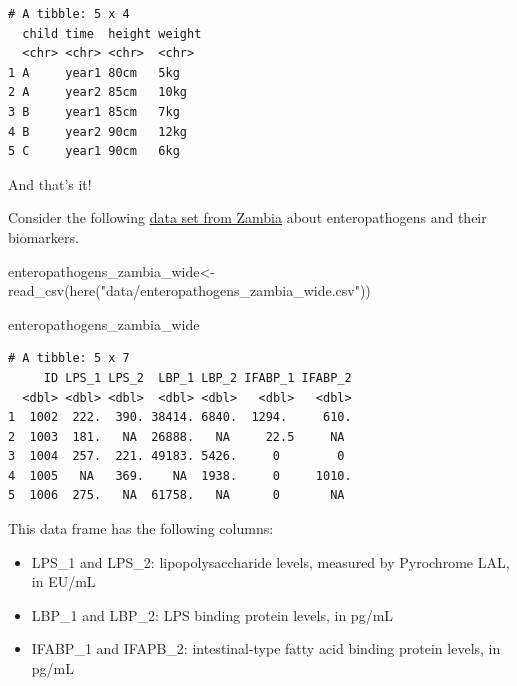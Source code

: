\documentclass[
  letterpaper,
  DIV=11,
  numbers=noendperiod]{scrreprt}
\newenvironment{Shaded}{\begin{snugshade}}{\end{snugshade}}
\newcommand{\FunctionTok}[1]{\textcolor[rgb]{0.28,0.35,0.67}{#1}}
\newcommand{\NormalTok}[1]{\textcolor[rgb]{0.00,0.23,0.31}{#1}}
\newcommand{\OtherTok}[1]{\textcolor[rgb]{0.00,0.23,0.31}{#1}}
\newcommand{\StringTok}[1]{\textcolor[rgb]{0.13,0.47,0.30}{#1}}
\begin{document}
\begin{verbatim}
# A tibble: 5 x 4
  child time  height weight
  <chr> <chr> <chr>  <chr> 
1 A     year1 80cm   5kg   
2 A     year2 85cm   10kg  
3 B     year1 85cm   7kg   
4 B     year2 90cm   12kg  
5 C     year1 90cm   6kg   
\end{verbatim}

And that's it!

\begin{tcolorbox}[enhanced jigsaw, title=\textcolor{quarto-callout-tip-color}{\faLightbulb}\hspace{0.5em}{Practice}, colbacktitle=quarto-callout-tip-color!10!white, leftrule=.75mm, arc=.35mm, opacityback=0, bottomrule=.15mm, rightrule=.15mm, toptitle=1mm, breakable, toprule=.15mm, colback=white, coltitle=black, colframe=quarto-callout-tip-color-frame, bottomtitle=1mm, titlerule=0mm, left=2mm, opacitybacktitle=0.6]

Consider the following \href{https://zenodo.org/record/4571669}{data set
from Zambia} about enteropathogens and their biomarkers.

\begin{Shaded}
\begin{Highlighting}[]
\NormalTok{enteropathogens\_zambia\_wide}\OtherTok{\textless{}{-}} \FunctionTok{read\_csv}\NormalTok{(}\FunctionTok{here}\NormalTok{(}\StringTok{"data/enteropathogens\_zambia\_wide.csv"}\NormalTok{))}

\NormalTok{enteropathogens\_zambia\_wide}
\end{Highlighting}
\end{Shaded}

\begin{verbatim}
# A tibble: 5 x 7
     ID LPS_1 LPS_2  LBP_1 LBP_2 IFABP_1 IFABP_2
  <dbl> <dbl> <dbl>  <dbl> <dbl>   <dbl>   <dbl>
1  1002  222.  390. 38414. 6840.  1294.     610.
2  1003  181.   NA  26888.   NA     22.5     NA 
3  1004  257.  221. 49183. 5426.     0        0 
4  1005   NA   369.    NA  1938.     0     1010.
5  1006  275.   NA  61758.   NA      0       NA 
\end{verbatim}

This data frame has the following columns:

\begin{itemize}
\item
  LPS\_1 and LPS\_2: lipopolysaccharide levels, measured by Pyrochrome
  LAL, in EU/mL
\item
  LBP\_1 and LBP\_2: LPS binding protein levels, in pg/mL
\item
  IFABP\_1 and IFAPB\_2: intestinal-type fatty acid binding protein
  levels, in pg/mL
\end{itemize}


\end{tcolorbox}
\end{document}
